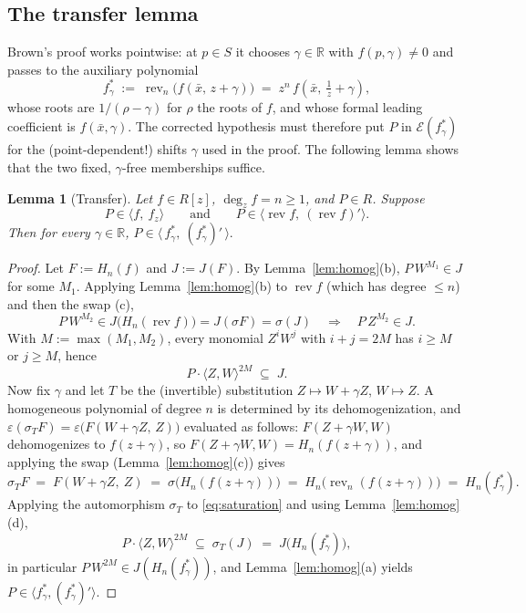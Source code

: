 \documentclass[11pt,a4paper]{article}
\newtheorem{lemma}[theorem]{Lemma}
\theoremstyle{definition}
\newcommand{\R}{\mathbb{R}}
\newcommand{\xb}{\bar{x}}
\newcommand{\rev}{\operatorname{rev}}
\newcommand{\E}{\mathcal{E}}
\newcommand{\ideal}[1]{\langle #1\rangle}
\begin{document}
\subsection{The transfer lemma}

Brown's proof works pointwise: at $p \in S$ it chooses $\gamma \in \R$ with
$f(p,\gamma) \neq 0$ and passes to the auxiliary polynomial
\[
  f^*_\gamma \;:=\; \rev_n\bigl(f(\xb,\, z+\gamma)\bigr)
  \;=\; z^n\, f\!\left(\xb,\ \tfrac1z + \gamma\right),
\]
whose roots are $1/(\rho - \gamma)$ for $\rho$ the roots of $f$, and whose
formal leading coefficient is $f(\xb,\gamma)$. The corrected hypothesis must
therefore put $P$ in $\E(f^*_\gamma)$ for the (point-dependent!) shifts
$\gamma$ used in the proof. The following lemma shows that the two fixed,
$\gamma$-free memberships suffice.

\begin{lemma}[Transfer]\label{lem:transfer}
Let $f \in R[z]$, $\deg_z f = n \geq 1$, and $P \in R$. Suppose
\[
  P \in \ideal{f,\ f_z} \qquad\text{and}\qquad
  P \in \ideal{\rev f,\ (\rev f)'} .
\]
Then for every $\gamma \in \R$,
\(
  P \in \ideal{\,f^*_\gamma,\ (f^*_\gamma)'\,}.
\)
\end{lemma}

\begin{proof}
Let $F := H_n(f)$ and $J := J(F)$. By Lemma~\ref{lem:homog}(b),
$P\,W^{M_1} \in J$ for some $M_1$. Applying Lemma~\ref{lem:homog}(b) to
$\rev f$ (which has degree $\le n$) and then the swap (c),
\[
  P\,W^{M_2} \in J\bigl(H_n(\rev f)\bigr) = J(\sigma F) = \sigma(J)
  \quad\Longrightarrow\quad P\,Z^{M_2} \in J .
\]
With $M := \max(M_1,M_2)$, every monomial $Z^iW^j$ with $i+j = 2M$ has
$i \geq M$ or $j \geq M$, hence
\begin{equation}\label{eq:saturation}
  P\cdot \ideal{Z,W}^{2M} \;\subseteq\; J .
\end{equation}
Now fix $\gamma$ and let $T$ be the (invertible) substitution
$Z \mapsto W + \gamma Z$, $W \mapsto Z$. A homogeneous polynomial of degree
$n$ is determined by its dehomogenization, and
$\varepsilon(\sigma_T F) = \varepsilon\bigl(F(W+\gamma Z,\, Z)\bigr)$
evaluated as follows: $F(Z + \gamma W, W)$ dehomogenizes to
$f(z+\gamma)$, so $F(Z+\gamma W, W) = H_n(f(z+\gamma))$, and applying the swap
(Lemma~\ref{lem:homog}(c)) gives
\[
  \sigma_T F \;=\; F(W + \gamma Z,\ Z) \;=\;
  \sigma\bigl(H_n(f(z+\gamma))\bigr) \;=\;
  H_n\bigl(\rev_n(f(z+\gamma))\bigr) \;=\; H_n(f^*_\gamma).
\]
Applying the automorphism $\sigma_T$ to \eqref{eq:saturation} and using
Lemma~\ref{lem:homog}(d),
\[
  P\cdot\ideal{Z,W}^{2M} \;\subseteq\; \sigma_T(J) \;=\;
  J\bigl(H_n(f^*_\gamma)\bigr) ,
\]
in particular $P\,W^{2M} \in J(H_n(f^*_\gamma))$, and
Lemma~\ref{lem:homog}(a) yields
$P \in \ideal{f^*_\gamma, (f^*_\gamma)'}$.
\end{proof}
\end{document}
